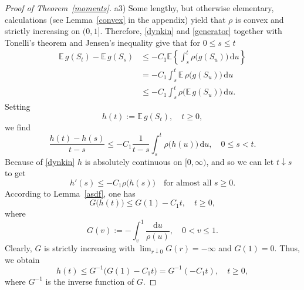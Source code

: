 \documentclass{aptpub}
\newcommand\EE{\mathds E}
\newcommand\dup{\mathrm{d}}
\numberwithin{equation}{section}
\begin{document}
\begin{proof}[Proof of Theorem~\ref{moments}]
\medskip\noindent a3)
Some lengthy, but otherwise elementary, calculations (see Lemma~\ref{convex} in the appendix) yield that $\rho$ is convex and strictly increasing on $(0,1]$. Therefore, \eqref{dynkin} and \eqref{generator} together with Tonelli's theorem and Jensen's inequality give that for $0\leq s\leq t$
\begin{align*}
    \EE\,g(S_t)-\EE\,g(S_s)
    &\leq-C_1 \EE\left\{\int_s^t\rho\big(g(S_u)\big)\,\dup u\right\}\\
    &=-C_1\int_s^t\EE\,\rho\big(g(S_u)\big)\,\dup u\\
    &\leq-C_1\int_s^t\rho\big(\EE\,g(S_u)\big)\,\dup u.
\end{align*}
Setting
$$
    h(t):=\EE\,g(S_t),\quad t\geq0,
$$
we find
$$
    \frac{h(t)-h(s)}{t-s}
    \leq-C_1\frac{1}{t-s} \int_s^t\rho\big(h(u)\big)\,\dup u,
    \quad 0\leq s<t.
$$
Because of \eqref{dynkin} $h$ is absolutely continuous on $[0,\infty)$, and so we can let $t\downarrow s$ to get
$$
    h'(s)
    \leq-C_1\rho\big(h(s)\big)
    \quad \text{for almost all $s\geq 0$}.
$$
According to Lemma~\ref{asdf}, one has
$$
    G\big(h(t)\big)\leq G(1)-C_1t,\quad t\geq0,
$$
where
$$
    G(v)
    :=-\int_v^1\frac{\dup u}{\rho(u)},
    \quad 0<v\leq1.
$$
Clearly, $G$ is strictly increasing with $\lim_{r\downarrow0}G(r)=-\infty$ and $G(1)=0$. Thus, we obtain
\begin{equation}\label{bound11}
    h(t)
    \leq G^{-1}\big(G(1)-C_1t\big)
    = G^{-1}\left(-C_1t\right),
    \quad t\geq0,
\end{equation}
where $G^{-1}$ is the inverse function of $G$.


\end{proof}
\end{document}
